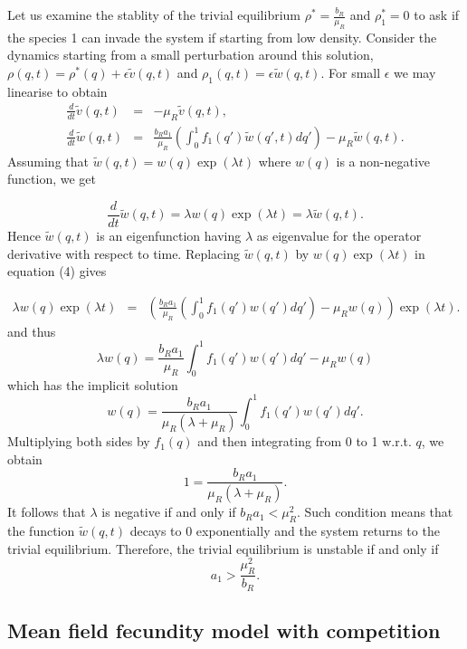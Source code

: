 \documentclass[8pt,a4paper]{article}
\begin{document}
Let us examine the stablity of the trivial equilibrium $\displaystyle{\rho^* =\frac{b_R}{\mu_R}}$ and $\rho_1 ^* =0$ to ask if the species 1 can invade the system if starting from low density.
Consider the dynamics starting from a small perturbation around this solution, $\rho(q,t)=\rho^*(q)+\epsilon \tilde{v}(q,t)$ and $\rho_1(q,t)=\epsilon \tilde{w}(q,t)$. For small $\epsilon$ we may linearise to obtain
\begin{eqnarray}
\frac{d}{dt} \tilde{v}(q,t) &=& - \mu_R \tilde{v}(q,t), \\
\frac{d}{d t} \tilde{w}(q,t) &=& \frac{b_R a_1}{\mu_R} \left(\int_0^1 f_1(q') \tilde{w}(q',t) dq'\right) -\mu_R \tilde{w}(q,t).
\end{eqnarray}
Assuming that $\tilde{w}(q,t)= w(q) \exp(\lambda t)$ where $w(q)$ is a non-negative function, we get

$$\frac{d}{dt} \tilde{w}(q,t)= \lambda w(q) \exp(\lambda t)= \lambda \tilde{w}(q,t).$$ Hence $\tilde{w}(q,t)$ is an eigenfunction having $\lambda$ as eigenvalue for the operator derivative with respect to time. Replacing $\tilde{w} (q,t)$ by $  w(q) \exp(\lambda t) $  in equation (4) gives

\begin{eqnarray*}
\lambda w(q) \exp(\lambda t)& = & \left(\frac{b_R a_1}{\mu_R} \left(\int_0^1 f_1(q') w(q') dq'\right) -\mu_R w(q)\right) \exp(\lambda t).
\end{eqnarray*}
and thus
$$\lambda w(q) = \frac{b_R a_1}{\mu_R} \int_0^1 f_1(q') w(q') dq' -\mu_R w(q)$$ 
which has the implicit solution
$$w(q) = \frac{b_R a_1}{\mu_R(\lambda +\mu_R )} \int_0^1 f_1(q') w(q')dq'. $$
Multiplying both sides by $f_1(q)$ and then integrating from 0 to 1 w.r.t. $q$, we obtain 
$$1= \frac{b_R a_1}{\mu_R (\lambda+ \mu_R)}.$$
It follows that $\lambda$ is negative if and only if $ b_R a_1 < \mu_R^2.$ Such condition means that the function $\tilde{w}(q,t)$ decays to $0$ exponentially and the system returns to the trivial equilibrium.  
Therefore, the trivial equilibrium is unstable if and only if
\begin{equation}
 a_1 > \frac{\mu_R^2}{b_R}.
\end{equation}

\subsection{ Mean field fecundity model with competition}
\end{document}
